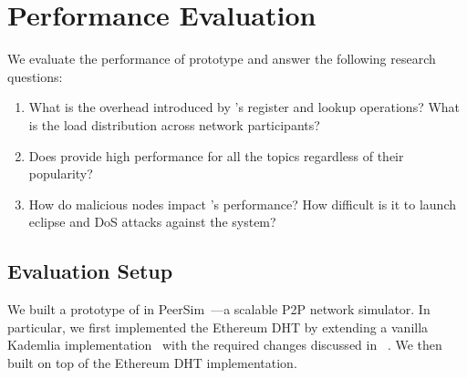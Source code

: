 
\section{Performance Evaluation}
\label{sec:eval}

We evaluate the performance of \sysname prototype and answer the following research questions:
\begin{enumerate} 
    \item What is the overhead introduced by \sysname's register and lookup operations? %
    What is the load distribution across network participants?
    \item Does \sysname provide high performance for all the topics regardless of their popularity? 
    \item How do malicious nodes impact \sysname's performance? How difficult is it to launch eclipse and DoS attacks against the system?
\end{enumerate}


\subsection{Evaluation Setup}
We built a prototype of \sysname in PeerSim~\cite{p2p09-peersim}---a scalable P2P network simulator. In particular, we first implemented the Ethereum DHT by extending a vanilla Kademlia implementation~\cite{peersim_kademlia} with the required changes discussed in ~. We then built \sysname on top of the Ethereum DHT implementation.

